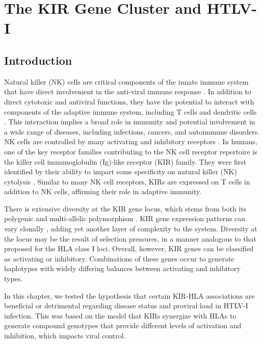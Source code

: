 
\chapter{The KIR Gene Cluster and HTLV-I}
\label{Chapter7}

\section{Introduction}

Natural killer (NK) cells are critical components of the innate immune system that have direct involvement in the anti-viral immune response \citep{Biron1999}. In addition to direct cytotoxic and antiviral functions, they have the potential to interact with components of the adaptive immune system, including T cells and dendritic cells \citep{Raulet2004}. This interaction implies a broad role in immunity and potential involvement in a wide range of diseases, including infections, cancers, and autoimmune disorders. NK cells are controlled by many activating and inhibitory receptors \citep{Lanier2005,Colucci2002}. In humans, one of the key receptor families contributing to the NK cell receptor repertoire is the killer cell immunoglobulin (Ig)-like receptor (KIR) family. They were first identified by their ability to impart some specificity on natural killer (NK) cytolysis \citep{Harel-Bellan1986,Moretta1990}. Similar to many NK cell receptors, KIRs are expressed on T cells in addition to NK cells, affirming their role in adaptive immunity.

There is extensive diversity at the KIR gene locus, which stems from both its polygenic and multi-allelic polymorphism \citep{Uhrberg1997}. KIR gene expression patterns can vary clonally \citep{Valiante1997}, adding yet another layer of complexity to the system. Diversity at the locus may be the result of selection pressures, in a manner analogous to that proposed for the HLA class I loci. Overall, however, KIR genes can be classified as activating or inhibitory. Combinations of these genes occur to generate haplotypes with widely differing balances between activating and inhibitory types.

In this chapter, we tested the hypothesis that certain KIR-HLA associations are beneficial or detrimental regarding disease status and proviral load in HTLV-I infection. This was based on the model that KIRs synergize with HLAs to generate compound genotypes that provide different levels of activation and inhibition, which impacts viral control. 

